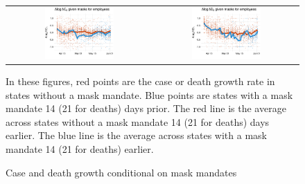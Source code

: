 \documentclass[11pt,reqno,letter]{amsart}
\theoremstyle{definition}
\begin{document}
\begin{figure}[ht]
  \caption{Case and death growth conditional on mask mandates \label{fig:masks}}\vspace{0.2cm}
 \begin{minipage}{\linewidth}
    \centering
    \begin{tabular}{cc}
      \includegraphics[width=0.5\textwidth]{tables_and_figures/pmaskbus-cases}
      &
        \includegraphics[width=0.5\textwidth]{tables_and_figures/pmaskbus-deaths}
    \end{tabular}
    \begin{flushleft}
      \scriptsize In these figures, red points are the case or death
      growth rate in states without a mask mandate. Blue points are
      states with a mask mandate 14 (21 for deaths) days prior. The
      red line is the average across states without a mask mandate 14
      (21 for deaths) days earlier. The blue line is the average
      across states with a mask mandate 14 (21 for deaths) earlier.
    \end{flushleft}
  \end{minipage}
\end{figure}
\end{document}

